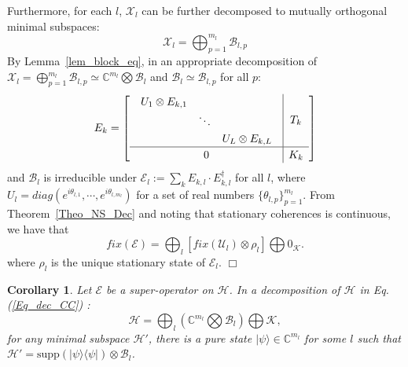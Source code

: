 \documentclass[journal]{IEEEtran}
\def\h{\ensuremath{\mathcal{H}}}
\def\u{\ensuremath{\mathcal{U}}}
\def\k{\ensuremath{\mathcal{K}}}
\def\u{\ensuremath{\mathcal{U}}}
\def\x{\ensuremath{\mathcal{X}}}
\def\b{\ensuremath{\mathcal{B}}}
\def\e{\ensuremath{\mathcal{E}}}
\def\k{\mathcal{K}}
\newtheorem{corollary}{Corollary}
\begin{document}
Furthermore, for each $l$, $\x_l$ can be further decomposed to mutually orthogonal minimal subspaces:
$$\x_l=\bigoplus_{p=1}^{m_l}\b_{l,p}$$
By Lemma~\ref{lem_block_eq}, %
in  an appropriate decomposition  of $\x_l=\bigoplus_{p=1}^{m_l}\b_{l,p}\simeq \mathbb{C}^{m_l}\bigotimes \b_l$ and $\b_l\simeq \b_{l,p}$ for all $p$:
\begin{eqnarray}
    \renewcommand{\arraystretch}{1.2}
E_k=\left[\begin{array}{c|c}
  \begin{array}{ccc}
  U_{1}\otimes E_{k,1} &  &\\
   & \ddots &\\
   & & U_{L}\otimes E_{k,L}  
  \end{array} & T_k\\
  \hline
0&K_k
\end{array}\right]
  \end{eqnarray}
and $\b_l$ is irreducible under $\e_{l}:=\sum_{k}E_{k,l}\cdot E_{k,l}^\dagger$  for all $l$, 
where $U_l=diag(e^{i\theta_{l,1}},\cdots,e^{i\theta_{l,m_l}})$ for a set of real numbers $\{\theta_{l,p}\}_{p=1}^{m_l}.$  From Theorem~\ref{Theo_NS_Dec} and noting that stationary coherences is continuous, we have that 
$$fix(\e)=\bigoplus_l[fix(\u_{l})\otimes \rho_l]\bigoplus 0_\k.$$ 
where $\rho_l$ is the unique stationary state of $\e_l.$ \hfill $\Box$
\begin{corollary}\label{Cor_mini}
  Let $\e$ be a super-operator  on $\h$. In a decomposition of $\h$ in Eq.(\ref{Eq_dec_CC}) :
$$\h=\bigoplus_l(\mathbb{C}^{m_l}\bigotimes \b_l)\bigoplus \k,$$ for any minimal subspace $\h'$, there is a pure state $|\psi\rangle\in \mathbb{C}^{m_l}$ for some $l$ such that $\h'=\textrm{supp}(|\psi\rangle\langle \psi|)\otimes \b_l$. 
\end{corollary}

\end{document}
